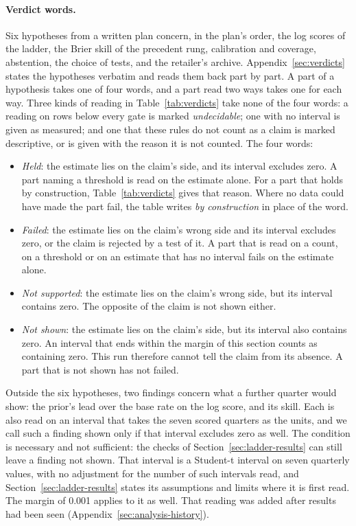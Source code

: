\documentclass[sigconf,nonacm]{acmart}
\begin{document}
\paragraph{Verdict words.}\label{sec:verdict-words}
Six hypotheses from a written plan concern, in the plan's order, the log scores of the ladder, the Brier skill of the precedent rung, calibration and coverage, abstention, the choice of tests, and the retailer's archive. Appendix~\ref{sec:verdicts} states the hypotheses verbatim and reads them back part by part. A part of a hypothesis takes one of four words, and a part read two ways takes one for each way. Three kinds of reading in Table~\ref{tab:verdicts} take none of the four words: a reading on rows below every gate is marked \emph{undecidable}; one with no interval is given as measured; and one that these rules do not count as a claim is marked descriptive, or is given with the reason it is not counted. The four words:
\begin{itemize}
\item \emph{Held}: the estimate lies on the claim's side, and its interval excludes zero. A part naming a threshold is read on the estimate alone. For a part that holds by construction, Table~\ref{tab:verdicts} gives that reason. Where no data could have made the part fail, the table writes \emph{by construction} in place of the word.
\item \emph{Failed}: the estimate lies on the claim's wrong side and its interval excludes zero, or the claim is rejected by a test of it. A part that is read on a count, on a threshold or on an estimate that has no interval fails on the estimate alone.
\item \emph{Not supported}: the estimate lies on the claim's wrong side, but its interval contains zero. The opposite of the claim is not shown either.
\item \emph{Not shown}: the estimate lies on the claim's side, but its interval also contains zero. An interval that ends within the margin of this section counts as containing zero. This run therefore cannot tell the claim from its absence. A part that is not shown has not failed.
\end{itemize}
Outside the six hypotheses, two findings concern what a further quarter would show: the prior's lead over the base rate on the log score, and its skill. Each is also read on an interval that takes the seven scored quarters as the units, and we call such a finding shown only if that interval excludes zero as well. The condition is necessary and not sufficient: the checks of Section~\ref{sec:ladder-results} can still leave a finding not shown. That interval is a Student-t interval on seven quarterly values, with no adjustment for the number of such intervals read, and Section~\ref{sec:ladder-results} states its assumptions and limits where it is first read. The margin of 0.001 applies to it as well. That reading was added after results had been seen (Appendix~\ref{sec:analysis-history}).
\end{document}
